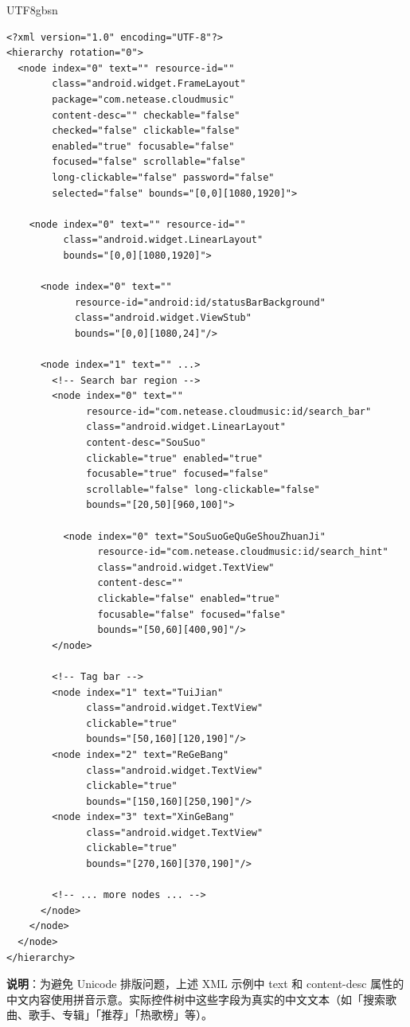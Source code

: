 \documentclass{article}
\begin{document}
\begin{CJK}{UTF8}{gbsn}
\begin{verbatim}
<?xml version="1.0" encoding="UTF-8"?>
<hierarchy rotation="0">
  <node index="0" text="" resource-id=""
        class="android.widget.FrameLayout"
        package="com.netease.cloudmusic"
        content-desc="" checkable="false"
        checked="false" clickable="false"
        enabled="true" focusable="false"
        focused="false" scrollable="false"
        long-clickable="false" password="false"
        selected="false" bounds="[0,0][1080,1920]">

    <node index="0" text="" resource-id=""
          class="android.widget.LinearLayout"
          bounds="[0,0][1080,1920]">

      <node index="0" text=""
            resource-id="android:id/statusBarBackground"
            class="android.widget.ViewStub"
            bounds="[0,0][1080,24]"/>

      <node index="1" text="" ...>
        <!-- Search bar region -->
        <node index="0" text=""
              resource-id="com.netease.cloudmusic:id/search_bar"
              class="android.widget.LinearLayout"
              content-desc="SouSuo"
              clickable="true" enabled="true"
              focusable="true" focused="false"
              scrollable="false" long-clickable="false"
              bounds="[20,50][960,100]">

          <node index="0" text="SouSuoGeQuGeShouZhuanJi"
                resource-id="com.netease.cloudmusic:id/search_hint"
                class="android.widget.TextView"
                content-desc=""
                clickable="false" enabled="true"
                focusable="false" focused="false"
                bounds="[50,60][400,90]"/>
        </node>

        <!-- Tag bar -->
        <node index="1" text="TuiJian"
              class="android.widget.TextView"
              clickable="true"
              bounds="[50,160][120,190]"/>
        <node index="2" text="ReGeBang"
              class="android.widget.TextView"
              clickable="true"
              bounds="[150,160][250,190]"/>
        <node index="3" text="XinGeBang"
              class="android.widget.TextView"
              clickable="true"
              bounds="[270,160][370,190]"/>

        <!-- ... more nodes ... -->
      </node>
    </node>
  </node>
</hierarchy>
\end{verbatim}

\textbf{说明}：为避免 Unicode 排版问题，上述 XML 示例中 text 和 content-desc 属性的中文内容使用拼音示意。实际控件树中这些字段为真实的中文文本（如「搜索歌曲、歌手、专辑」「推荐」「热歌榜」等）。


\end{CJK}
\end{document}
